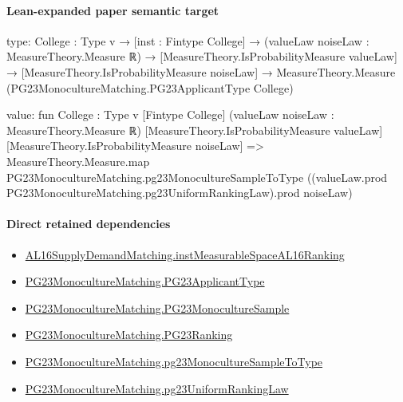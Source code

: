 \documentclass[10pt]{article}
\begin{document}
\paragraph{Lean-expanded paper semantic target}
\begin{ReviewVerbatim}
type:
{College : Type v} →
  [inst : Fintype College] →
    (valueLaw noiseLaw : MeasureTheory.Measure ℝ) →
      [MeasureTheory.IsProbabilityMeasure valueLaw] →
        [MeasureTheory.IsProbabilityMeasure noiseLaw] →
          MeasureTheory.Measure (PG23MonocultureMatching.PG23ApplicantType College)

value:
fun {College : Type v} [Fintype College] (valueLaw noiseLaw : MeasureTheory.Measure ℝ)
    [MeasureTheory.IsProbabilityMeasure valueLaw] [MeasureTheory.IsProbabilityMeasure noiseLaw] =>
  MeasureTheory.Measure.map PG23MonocultureMatching.pg23MonocultureSampleToType
    ((valueLaw.prod PG23MonocultureMatching.pg23UniformRankingLaw).prod noiseLaw)
\end{ReviewVerbatim}

\paragraph{Direct retained dependencies}
\begin{itemize}\raggedright
\item \hyperlink{governing-declaration-45aa1aca7604d942}{AL16\allowbreak{}Supply\allowbreak{}Demand\allowbreak{}Matching.\allowbreak{}inst\allowbreak{}Measurable\allowbreak{}Space\allowbreak{}AL16\allowbreak{}Ranking}
\item \hyperlink{paper-prerequisite-40ad59c353cf95ec}{PG23\allowbreak{}Monoculture\allowbreak{}Matching.\allowbreak{}PG23\allowbreak{}Applicant\allowbreak{}Type}
\item \hyperlink{governing-declaration-f25f7668232f8d8d}{PG23\allowbreak{}Monoculture\allowbreak{}Matching.\allowbreak{}PG23\allowbreak{}Monoculture\allowbreak{}Sample}
\item \hyperlink{paper-prerequisite-8769258a80216d15}{PG23\allowbreak{}Monoculture\allowbreak{}Matching.\allowbreak{}PG23\allowbreak{}Ranking}
\item \hyperlink{paper-prerequisite-ce180956cf3f637e}{PG23\allowbreak{}Monoculture\allowbreak{}Matching.\allowbreak{}pg23\allowbreak{}Monoculture\allowbreak{}Sample\allowbreak{}To\allowbreak{}Type}
\item \hyperlink{paper-prerequisite-b9080a6bda2a8422}{PG23\allowbreak{}Monoculture\allowbreak{}Matching.\allowbreak{}pg23\allowbreak{}Uniform\allowbreak{}Ranking\allowbreak{}Law}
\end{itemize}
\end{document}
